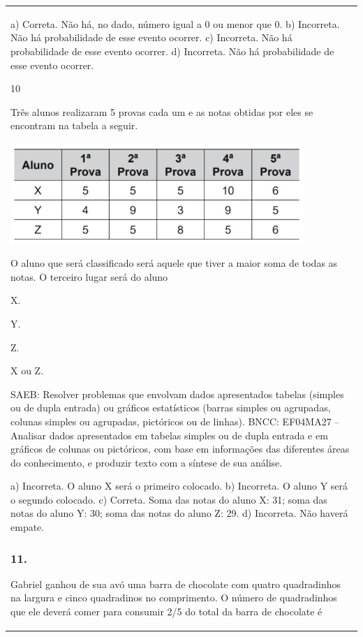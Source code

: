 \begin{mdframed}[linewidth=2pt,linecolor=salmao,roundcorner=2pt]
\begin{escolha}
{{{\begin{longtable}[]{@{}l@{}}
\begin{itemize}
{a) Correta. Não há, no dado, número igual a 0 ou menor que 0.
b) Incorreta. Não há probabilidade de esse evento ocorrer.
c) Incorreta. Não há probabilidade de esse evento ocorrer.
d) Incorreta. Não há probabilidade de esse evento ocorrer.

\num{10}

Três alunos realizaram 5 provas cada um e as notas obtidas por eles se
encontram na tabela a seguir.


\includegraphics[width=4.38462in,height=1.50708in]{media/image157.png}

O aluno que será classificado será aquele que tiver a maior
soma de todas as notas. O terceiro lugar será do aluno

\begin{escolha}
\item
  X.
\item
  Y.
\item
  Z.
\item
  X ou Z.
\end{escolha}

SAEB: Resolver problemas que envolvam dados apresentados
tabelas (simples ou de dupla entrada) ou gráficos estatísticos (barras
simples ou agrupadas, colunas simples ou agrupadas, pictóricos ou de
linhas).
BNCC: EF04MA27 -- Analisar dados apresentados em tabelas simples ou de dupla entrada e em gráficos de
colunas ou pictóricos, com base em informações das diferentes áreas do conhecimento, e produzir
texto com a síntese de sua análise.

a) Incorreta. O aluno X será o primeiro colocado.
b) Incorreta. O aluno Y será o segundo colocado.
c) Correta. Soma das notas do aluno X: 31; soma das notas do aluno Y: 30; soma das notas do aluno Z: 29.
d) Incorreta. Não haverá empate.

\subsubsection{11.}

Gabriel ganhou de sua avó uma barra de chocolate com quatro quadradinhos na largura e cinco quadradinos no comprimento.
O número de quadradinhos que ele deverá comer para consumir 2/5 do total
da barra de chocolate é

}
\end{itemize}
\end{longtable}}}}
\end{escolha}
\end{mdframed}
